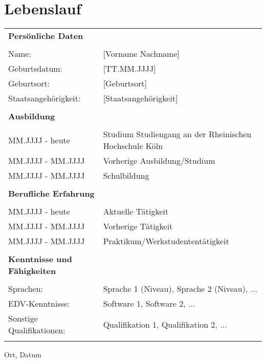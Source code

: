 \chapter*{Lebenslauf}
\label{sec:lebenslauf}

\begin{tabular}{p{}p{}}
\textbf{Persönliche Daten} & \\
\\
Name: & [Vorname Nachname] \\
Geburtsdatum: & [TT.MM.JJJJ] \\
Geburtsort: & [Geburtsort] \\
Staatsangehörigkeit: & [Staatsangehörigkeit] \\
\\
\textbf{Ausbildung} & \\
\\
MM.JJJJ - heute & Studium Studiengang an der Rheinischen Hochschule Köln \\
MM.JJJJ - MM.JJJJ & Vorherige Ausbildung/Studium \\
MM.JJJJ - MM.JJJJ & Schulbildung \\
\\
\textbf{Berufliche Erfahrung} & \\
\\
MM.JJJJ - heute & Aktuelle Tätigkeit \\
MM.JJJJ - MM.JJJJ & Vorherige Tätigkeit \\
MM.JJJJ - MM.JJJJ & Praktikum/Werkstudententätigkeit \\
\\
\textbf{Kenntnisse und Fähigkeiten} & \\
\\
Sprachen: & Sprache 1 (Niveau), Sprache 2 (Niveau), ... \\
EDV-Kenntnisse: & Software 1, Software 2, ... \\
Sonstige Qualifikationen: & Qualifikation 1, Qualifikation 2, ... \\
\\
\end{tabular}

\vspace{1cm}

\begin{center}
Ort, Datum
\end{center}